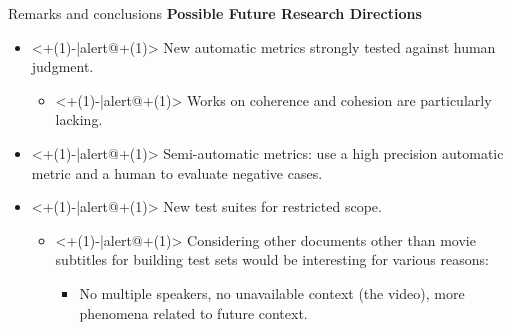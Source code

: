\begin{frame}{Remarks and conclusions}
	\textbf{Possible Future Research Directions}
	\begin{itemize}
		\item<+(1)-|alert@+(1)> New automatic metrics strongly tested against human judgment.
			\begin{itemize}
				\item<+(1)-|alert@+(1)> Works on coherence and cohesion are particularly lacking.
			\end{itemize}
		\item<+(1)-|alert@+(1)> Semi-automatic metrics: use a high precision automatic metric and a human to evaluate negative cases.
		\item<+(1)-|alert@+(1)> New test suites for restricted scope.
			\begin{itemize}
				\item<+(1)-|alert@+(1)> Considering other documents other than movie subtitles for building test sets would be interesting for various reasons:
				\begin{itemize}
					\item No multiple speakers, no unavailable context (the video), more phenomena related to future context. 
				\end{itemize}
				 
			\end{itemize}
	\end{itemize}
\end{frame}



		


